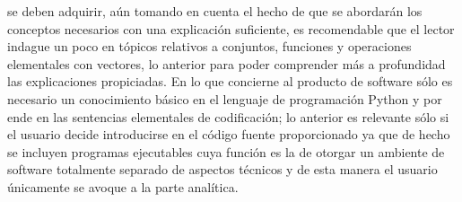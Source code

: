 \documentclass[class=report, crop=false]{standalone}
\begin{document}
se deben adquirir, aún tomando en cuenta el hecho de que se 
abordarán los conceptos necesarios con una explicación suficiente, 
es recomendable que el lector indague un poco en tópicos 
relativos a conjuntos, funciones y operaciones elementales con 
vectores, lo anterior para poder comprender más a profundidad 
las explicaciones propiciadas.\medskip\break
En lo que concierne al producto de software sólo es necesario 
un conocimiento básico en el lenguaje de programación Python 
y por ende en las sentencias elementales de codificación; 
lo anterior es relevante sólo si el usuario decide introducirse 
en el código fuente proporcionado ya que de hecho se incluyen 
programas ejecutables cuya función es la de otorgar un ambiente 
de software totalmente separado de aspectos técnicos y de esta 
manera el usuario únicamente se avoque a la parte analítica.

\end{document}
